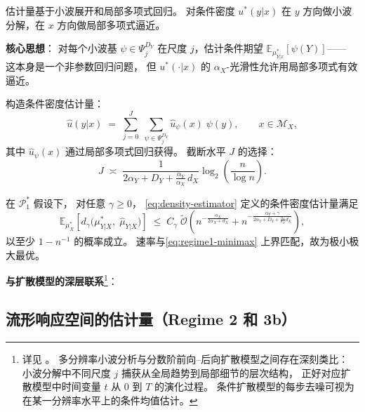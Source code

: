 估计量基于小波展开和局部多项式回归。
对条件密度 $u^*(y|x)$ 在 $y$ 方向做小波分解，在 $x$ 方向做局部多项式逼近。

\textbf{核心思想}：
对每个小波基 $\psi \in \Psi_j^{D_Y}$ 在尺度 $j$，估计条件期望
$\mathbb{E}_{\mu^*_{Y|x}}[\psi(Y)]$——
这本身是一个非参数回归问题，
但 $u^*(\cdot|x)$ 的 $\alpha_X$-光滑性允许用局部多项式有效逼近。

构造条件密度估计量：
\begin{equation}\label{eq:density-estimator}
    \widehat{u}(y|x) \;=\;
    \sum_{j=0}^{J}\;\sum_{\psi \in \Psi_j^{D_Y}}
    \widehat{u}_\psi(x)\;\psi(y),
    \qquad x \in \mathcal{M}_X,
\end{equation}
其中 $\widehat{u}_\psi(x)$ 通过局部多项式回归获得。
截断水平 $J$ 的选择：
\begin{equation}\label{eq:J-choice}
    J \;\asymp\;
    \frac{1}{2\alpha_Y + D_Y + \frac{\alpha_Y}{\alpha_X}\,d_X}
    \log_2\!\left(\frac{n}{\log n}\right).
\end{equation}

\begin{Theorem}\label{def:thm-estimator-regime1}
    在 $\mathcal{P}_1^*$ 假设下，
    对任意 $\gamma \geq 0$，
    \cref{eq:density-estimator} 定义的条件密度估计量满足
    \begin{equation}\label{eq:estimator-regime1-rate}
        \mathbb{E}_{\mu^*_X}\!\left[
            d_\gamma\!\big(\mu^*_{Y|X},\; \widehat{\mu}_{Y|X}\big)
        \right]
        \;\leq\;
        C_\gamma\;\widetilde{\mathcal{O}}\!\left(
            n^{-\frac{\alpha_X}{2\alpha_X + d_X}}
            + n^{-\frac{\alpha_Y + \gamma}{2\alpha_Y + D_Y + \frac{\alpha_Y}{\alpha_X}d_X}}
        \right),
    \end{equation}
    以至少 $1 - n^{-1}$ 的概率成立。
    速率与\cref{eq:regime1-minimax} 上界匹配，故为极小极大最优。
\end{Theorem}

\textbf{与扩散模型的深层联系}\footnote{详见 \citep[Section 3.3]{tang2025regression}。
多分辨率小波分析与分数阶前向--后向扩散模型之间存在深刻类比：
小波分解中不同尺度 $j$ 捕获从全局趋势到局部细节的层次结构，
正好对应扩散模型中时间变量 $t$ 从 $0$ 到 $T$ 的演化过程。
条件扩散模型的每步去噪可视为在某一分辨率水平上的条件均值估计。}：

\subsection{流形响应空间的估计量（Regime 2 和 3b）}\label{sec:ch2-estimator-manifold}

